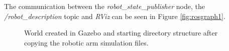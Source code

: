 \documentclass[12pt,oneside]{article}
\begin{document}
The communication between the \textit{robot\_state\_publisher} node, the \textit{/robot\_description} topic and \textit{RViz} can be seen in Figure \ref{fig:rosgraph1}. 
\begin{figure}[H]
  \centering
  \hfill
  \caption{World created in Gazebo and starting directory structure after copying the robotic arm simulation files.}
\end{figure}
\end{document}
